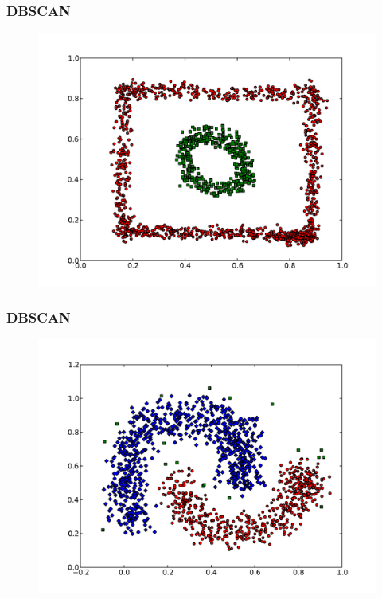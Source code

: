 \documentclass{beamer}
\begin{document}
\begin{frame}
\frametitle{DBSCAN}
    \begin{figure}[]
    \includegraphics[scale=0.5]{dbscan_circle-weird.pdf}
    \end{figure}
\end{frame}

\begin{frame}
\frametitle{DBSCAN}
    \begin{figure}[]
    \includegraphics[scale=0.5]{dbscan_half-moons.pdf}
    \end{figure}
\end{frame}
\end{document}
